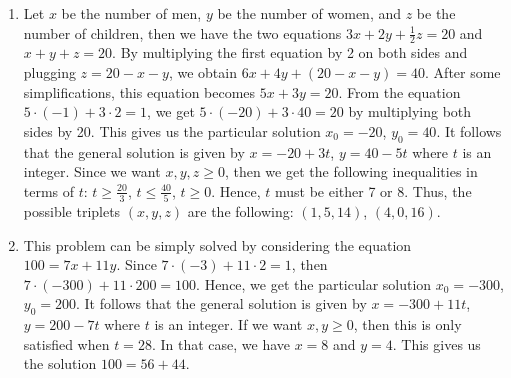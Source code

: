 \begin{solution}
\begin{enumerate}
        \item Let $x$ be the number of men, $y$ be the number of women, and $z$ be the number of children, then we have the two equations $3x + 2y + \frac{1}{2}z = 20$ and $x + y + z = 20$. By multiplying the first equation by 2 on both sides and plugging $z = 20 - x - y$, we obtain $6x + 4y + (20 - x - y) = 40$. After some simplifications, this equation becomes $5x + 3y = 20$. From the equation $5 \cdot (-1) + 3 \cdot 2 = 1$, we get $5 \cdot (-20) + 3 \cdot 40 = 20$ by multiplying both sides by 20. This gives us the particular solution $x_0 = -20$, $y_0 = 40$. It follows that the general solution is given by $x = -20 + 3t$, $y = 40 - 5t$ where $t$ is an integer. Since we want $x,y,z \geq 0$, then we get the following inequalities in terms of $t$: $t \geq \frac{20}{3}$, $t \leq \frac{40}{5}$, $t \geq 0$. Hence, $t$ must be either 7 or 8. Thus, the possible triplets $(x,y,z)$ are the following: $(1,5, 14)$, $(4, 0, 16)$.
        \item This problem can be simply solved by considering the equation $100 = 7x + 11y$. Since $7 \cdot (-3) + 11 \cdot 2 = 1$, then $7 \cdot (-300) + 11 \cdot 200 = 100$. Hence, we get the particular solution $x_0 = -300$, $y_0 = 200$. It follows that the general solution is given by $x = -300 + 11t$, $y = 200 - 7t$ where $t$ is an integer. If we want $x, y \geq 0$, then this is only satisfied when $t = 28$. In that case, we have $x = 8$ and $y = 4$. This gives us the solution $100 = 56 + 44$.
    \end{enumerate}
\end{solution}